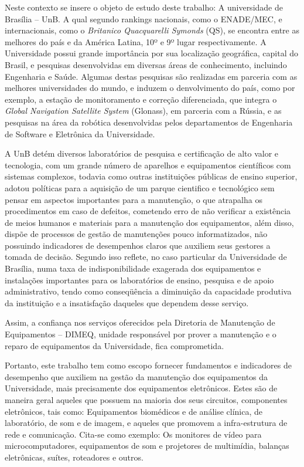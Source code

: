 Neste contexto se insere o objeto de estudo deste trabalho: A universidade de Brasília – UnB. A qual segundo rankings nacionais, como o ENADE/MEC, e internacionais, como o \emph{Britanico Quacquarelli Symonds} (QS), se encontra entre as melhores do país e da América Latina, 10º e 9º lugar respectivamente. A Universidade possui grande importância por sua localização geográfica, capital do Brasil, e pesquisas desenvolvidas em diversas áreas de conhecimento, incluindo Engenharia e Saúde. Algumas destas pesquisas são realizadas em parceria com as melhores universidades do mundo, e induzem o denvolvimento do país, como por exemplo, a estação de monitoramento e correção diferenciada, que integra o \emph{Global Navigation Satellite System} (Glonass), em parceria com a Rússia, e as pesquisas na área da robótica desenvolvidas pelos departamentos de Engenharia de Software e Eletrônica da Universidade.

A UnB detém diversos laboratórios de pesquisa e certificação de alto valor e tecnologia, com um grande número de aparelhos e equipamentos científicos com sistemas complexos, todavia como outras instituições públicas de ensino superior, adotou políticas para a aquisição de um parque cientifico e tecnológico sem pensar em aspectos importantes para a manutenção, o que atrapalha os procedimentos em caso de defeitos, cometendo erro de não verificar a existência de meios humanos e materiais para a manutenção dos equipamentos, além disso, dispõe de processos de gestão de manutenções pouco informatizados, não possuindo indicadores de desempenhos claros que auxiliem seus gestores a tomada de decisão. Segundo \cite{limacastilho2006} isso reflete, no caso particular da Universidade de Brasília, numa taxa de indisponibilidade exagerada dos equipamentos e instalações importantes para os laboratórios de ensino, pesquisa e de apoio administrativo, tendo como conseqüência a diminuição da capacidade produtiva da instituição e a insatisfação daqueles que dependem desse serviço.

Assim, a confiança nos serviços oferecidos pela Diretoria de Manutenção de Equipamentos – DIMEQ, unidade responsável por prover a manutenção e o reparo de equipamentos da Universidade, fica comprometida. 

Portanto, este trabalho tem como escopo fornecer fundamentos e indicadores de desempenho que auxiliem na gestão da manutenção dos equipamentos da Universidade, mais precisamente dos equipamentos eletrônicos. Estes são de maneira geral aqueles que possuem na maioria dos seus circuitos, componentes eletrônicos, tais como: Equipamentos biomédicos e de análise clínica, de laboratório, de som e de imagem, e aqueles que promovem a infra-estrutura de rede e comunicação. Cita-se como exemplo: Os monitores de vídeo para microcomputadores, equipamentos de som e projetores de multimídia, balanças eletrônicas, suítes, roteadores e outros.


